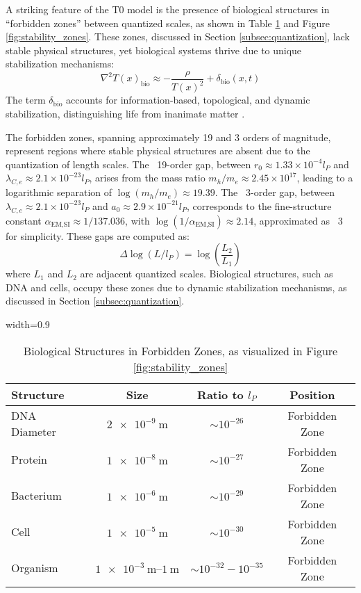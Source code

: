 \documentclass[12pt,a4paper]{article}
\newcommand{\Tfield}{T(x)}
\newcommand{\tablescale}{0.9}
\begin{document}
	A striking feature of the T0 model is the presence of biological structures in “forbidden zones” between quantized scales, as shown in Table \ref{tab:bio_anomalies} and Figure \ref{fig:stability_zones}. These zones, discussed in Section \ref{subsec:quantization}, lack stable physical structures, yet biological systems thrive due to unique stabilization mechanisms:
	\[
	\nabla^2 \Tfield_{\text{bio}} \approx -\frac{\rho}{\Tfield^2} + \delta_{\text{bio}}(x,t)
	\]
	The term \(\delta_{\text{bio}}\) accounts for information-based, topological, and dynamic stabilization, distinguishing life from inanimate matter \cite{pascher_dualismus_2025}.
	
	The forbidden zones, spanning approximately 19 and 3 orders of magnitude, represent regions where stable physical structures are absent due to the quantization of length scales. The ~19-order gap, between \( r_0 \approx 1.33 \times 10^{-4} l_P \) and \( \lambda_{C,e} \approx 2.1 \times 10^{-23} l_P \), arises from the mass ratio \( m_h / m_e \approx 2.45 \times 10^{17} \), leading to a logarithmic separation of \( \log(m_h / m_e) \approx 19.39 \). The ~3-order gap, between \( \lambda_{C,e} \approx 2.1 \times 10^{-23} l_P \) and \( a_0 \approx 2.9 \times 10^{-21} l_P \), corresponds to the fine-structure constant \( \alpha_{\text{EM,SI}} \approx 1/137.036 \), with \( \log(1 / \alpha_{\text{EM,SI}}) \approx 2.14 \), approximated as ~3 for simplicity. These gaps are computed as:
	\[
	\Delta \log(L / l_P) = \log\left(\frac{L_2}{L_1}\right)
	\]
	where \( L_1 \) and \( L_2 \) are adjacent quantized scales. Biological structures, such as DNA and cells, occupy these zones due to dynamic stabilization mechanisms, as discussed in Section \ref{subsec:quantization}.
	
	\begin{table}[htbp]
		\centering
		\begin{adjustbox}{width=\tablescale\textwidth}
			\begin{tabular}{lccc}
				\toprule
				\textbf{Structure} & \textbf{Size} & \textbf{Ratio to \(l_P\)} & \textbf{Position} \\
				\midrule
				DNA Diameter & \(\SI{2e-9}{\meter}\) & \(\sim 10^{-26}\) & Forbidden Zone \\
				Protein & \(\SI{1e-8}{\meter}\) & \(\sim 10^{-27}\) & Forbidden Zone \\
				Bacterium & \(\SI{1e-6}{\meter}\) & \(\sim 10^{-29}\) & Forbidden Zone \\
				Cell & \(\SI{1e-5}{\meter}\) & \(\sim 10^{-30}\) & Forbidden Zone \\
				Organism & \(\SIrange{1e-3}{1}{\meter}\) & \(\sim 10^{-32} - 10^{-35}\) & Forbidden Zone \\
				\bottomrule
			\end{tabular}
		\end{adjustbox}
		\caption{Biological Structures in Forbidden Zones, as visualized in Figure \ref{fig:stability_zones}}
		\label{tab:bio_anomalies}
	\end{table}
	
\end{document}
